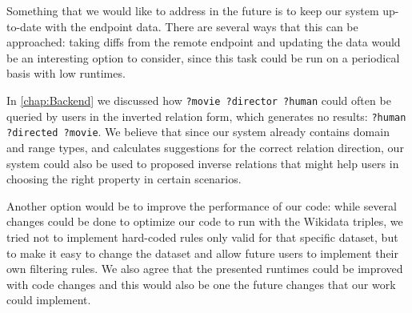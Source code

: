 Something that we would like to address in the future is to keep our system up-to-date with the endpoint data. There are several ways that this can be approached: taking diffs from the remote endpoint and updating the data would be an interesting option to consider, since this task could be run on a periodical basis with low runtimes. 

In \autoref{chap:Backend} we discussed how \texttt{?movie ?director ?human} could often be queried by users in the inverted relation form, which generates no results: \texttt{?human ?directed ?movie}. We believe that since our system already contains domain and range types, and calculates suggestions for the correct relation direction, our system could also be used to proposed inverse relations that might help users in choosing the right property in certain scenarios.

Another option would be to improve the performance of our code: while several changes could be done to optimize our code to run with the Wikidata triples, we tried not to implement hard-coded rules only valid for that specific dataset, but to make it easy to change the dataset and allow future users to implement their own filtering rules. We also agree that the presented runtimes could be improved with code changes and this would also be one the future changes that our work could implement.